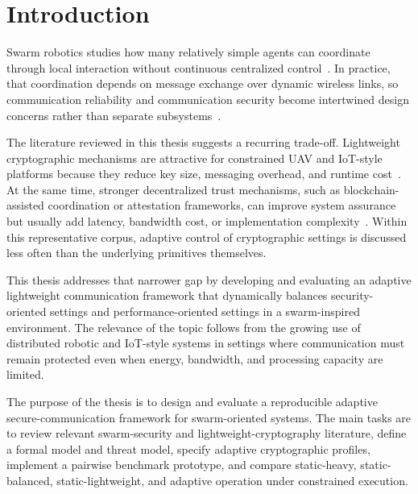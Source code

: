 \chapter{Introduction}
\label{chap:intro}

Swarm robotics studies how many relatively simple agents can coordinate through local interaction without continuous centralized control~\cite{diasSwarmRoboticsPerspective2021,debieSwarmRoboticsSurvey2023}. In practice, that coordination depends on message exchange over dynamic wireless links, so communication reliability and communication security become intertwined design concerns rather than separate subsystems~\cite{varadharajanSwarmRelaysDistributed2020,chenSecuringEmergentBehaviour2021}.

The literature reviewed in this thesis suggests a recurring trade-off. Lightweight cryptographic mechanisms are attractive for constrained UAV and IoT-style platforms because they reduce key size, messaging overhead, and runtime cost~\cite{adeniyiSystematicReviewECC2024,hanLightweightSecureCommunication2025,manikandanASMTPAnonymousSecureMessaging2024}. At the same time, stronger decentralized trust mechanisms, such as blockchain-assisted coordination or attestation frameworks, can improve system assurance but usually add latency, bandwidth cost, or implementation complexity~\cite{sunResearchDataSecurityEmergency2022,pachecoSecuringFederatedLearning2024,kohliSwarmNetFirmwareAttestation2024}. Within this representative corpus, adaptive control of cryptographic settings is discussed less often than the underlying primitives themselves.

This thesis addresses that narrower gap by developing and evaluating an adaptive lightweight communication framework that dynamically balances security-oriented settings and performance-oriented settings in a swarm-inspired environment. The relevance of the topic follows from the growing use of distributed robotic and IoT-style systems in settings where communication must remain protected even when energy, bandwidth, and processing capacity are limited.

The purpose of the thesis is to design and evaluate a reproducible adaptive secure-communication framework for swarm-oriented systems. The main tasks are to review relevant swarm-security and lightweight-cryptography literature, define a formal model and threat model, specify adaptive cryptographic profiles, implement a pairwise benchmark prototype, and compare static-heavy, static-balanced, static-lightweight, and adaptive operation under constrained execution.

